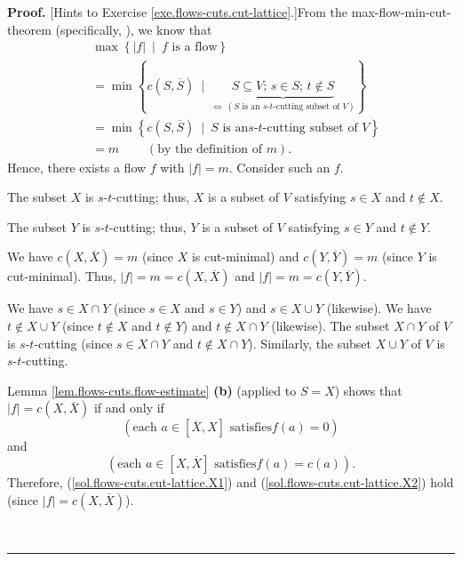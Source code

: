 \documentclass[numbers=enddot,12pt,final,onecolumn,notitlepage]{scrartcl}%
\theoremstyle{definition}
\newenvironment{proof}[1][Proof]{\noindent\textbf{#1.} }{\ \rule{0.5em}{0.5em}}
\begin{document}
\begin{proof}
[Hints to Exercise \ref{exe.flows-cuts.cut-lattice}.]From the
max-flow-min-cut-theorem (specifically, \cite[Theorem 1.10]{lec16}), we know
that%
\begin{align*}
&  \max\left\{  \left\vert f\right\vert \ \mid\ f\text{ is a flow}\right\} \\
&  =\min\left\{  c\left(  S,\overline{S}\right)  \ \mid
\ \underbrace{S\subseteq V\text{; }s\in S\text{; }t\notin S}%
_{\Longleftrightarrow\ \left(  S\text{ is an }s\text{-}t\text{-cutting subset
of }V\right)  }\right\} \\
&  =\min\left\{  c\left(  S,\overline{S}\right)  \ \mid\ S\text{ is an
}s\text{-}t\text{-cutting subset of }V\right\} \\
&  =m\ \ \ \ \ \ \ \ \ \ \left(  \text{by the definition of }m\right)  .
\end{align*}
Hence, there exists a flow $f$ with $\left\vert f\right\vert =m$. Consider
such an $f$.

The subset $X$ is $s$-$t$-cutting; thus, $X$ is a subset of $V$ satisfying
$s\in X$ and $t\notin X$.

The subset $Y$ is $s$-$t$-cutting; thus, $Y$ is a subset of $V$ satisfying
$s\in Y$ and $t\notin Y$.

We have $c\left(  X,\overline{X}\right)  =m$ (since $X$ is cut-minimal) and
$c\left(  Y,\overline{Y}\right)  =m$ (since $Y$ is cut-minimal). Thus,
$\left\vert f\right\vert =m=c\left(  X,\overline{X}\right)  $ and $\left\vert
f\right\vert =m=c\left(  Y,\overline{Y}\right)  $.

We have $s\in X\cap Y$ (since $s\in X$ and $s\in Y$) and $s\in X\cup Y$
(likewise). We have $t\notin X\cup Y$ (since $t\notin X$ and $t\notin Y$) and
$t\notin X\cap Y$ (likewise). The subset $X\cap Y$ of $V$ is $s$-$t$-cutting
(since $s\in X\cap Y$ and $t\notin X\cap Y$). Similarly, the subset $X\cup Y$
of $V$ is $s$-$t$-cutting.

Lemma \ref{lem.flows-cuts.flow-estimate} \textbf{(b)} (applied to $S=X$) shows
that $\left\vert f\right\vert =c\left(  X,\overline{X}\right)  $ if and only
if
\begin{equation}
\left(  \text{each }a\in\left[  \overline{X},X\right]  \text{ satisfies
}f\left(  a\right)  =0\right)  \label{sol.flows-cuts.cut-lattice.X1}%
\end{equation}
and%
\begin{equation}
\left(  \text{each }a\in\left[  X,\overline{X}\right]  \text{ satisfies
}f\left(  a\right)  =c\left(  a\right)  \right)
.\label{sol.flows-cuts.cut-lattice.X2}%
\end{equation}
Therefore, (\ref{sol.flows-cuts.cut-lattice.X1}) and
(\ref{sol.flows-cuts.cut-lattice.X2}) hold (since $\left\vert f\right\vert
=c\left(  X,\overline{X}\right)  $).


\end{proof}
\end{document}
